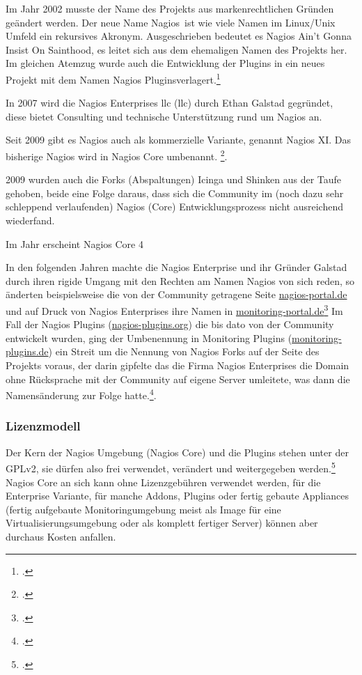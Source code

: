 \documentclass[12pt,a4paper,parskip,listof=totoc,bibliography=totoc]{scrreprt}
\begin{document}
	Im Jahr 2002 musste der Name des Projekts aus markenrechtlichen Gründen geändert werden. Der neue Name \glqq Nagios\grqq\ ist wie viele Namen im Linux/Unix Umfeld ein rekursives Akronym. Ausgeschrieben bedeutet es \glqq Nagios Ain’t Gonna Insist On Sainthood\grqq, es leitet sich aus dem ehemaligen Namen des Projekts her. Im gleichen Atemzug wurde auch die Entwicklung der Plugins in ein neues Projekt mit dem Namen \glqq Nagios Plugins\grqq verlagert.\footcite{nagiosnamefaq}
	
	In 2007 wird die Nagios Enterprises \acrshort{llc} (\acrlong{llc}) durch Ethan Galstad gegründet, diese bietet Consulting und technische Unterstützung rund um Nagios an.
	
	Seit 2009 gibt es Nagios auch als kommerzielle Variante, genannt Nagios XI. Das bisherige Nagios wird in Nagios Core umbenannt.
	\footcite{nagioshistory}. 
	
	2009 wurden auch die Forks (Abspaltungen) Icinga und Shinken aus der Taufe gehoben, beide eine Folge daraus, dass sich die Community im (noch dazu sehr schleppend verlaufenden) Nagios (Core) Entwicklungsprozess nicht ausreichend wiederfand.
	
	Im Jahr erscheint Nagios Core 4
	
	In den folgenden Jahren machte die Nagios Enterprise und ihr Gründer Galstad durch ihren rigide Umgang mit den Rechten am Namen Nagios von sich reden, so änderten beispielsweise die von der Community getragene Seite \url{nagios-portal.de} und  auf Druck von Nagios Enterprises ihre Namen in \url{monitoring-portal.de}\footcite{nagiosportal}  Im Fall der Nagios Plugins (\url{nagios-plugins.org}) die bis dato von der Community entwickelt wurden, ging der Umbenennung in Monitoring Plugins (\url{monitoring-plugins.de})  ein Streit um die Nennung von Nagios Forks auf der Seite des Projekts voraus, der darin gipfelte das die Firma Nagios Enterprises die Domain ohne Rücksprache mit der Community auf eigene Server umleitete, was dann die Namensänderung zur Folge hatte.\footcite{nagiosplugin}.
	
	\subsubsection{Lizenzmodell}
	Der Kern der Nagios Umgebung (Nagios Core) und die Plugins stehen unter der GPLv2, sie dürfen also frei verwendet, verändert und weitergegeben werden.\footcite{gplv2en} Nagios Core an sich kann ohne Lizenzgebühren verwendet werden, für die Enterprise Variante, für manche Addons, Plugins oder fertig gebaute Appliances (fertig aufgebaute Monitoringumgebung meist als Image für eine Virtualisierungsumgebung oder als komplett fertiger Server) können aber durchaus Kosten anfallen.
\end{document}
